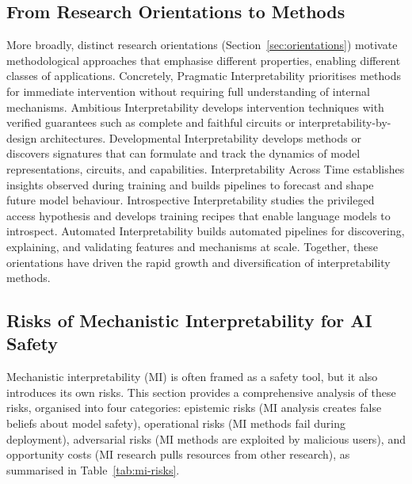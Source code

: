 \subsection{From Research Orientations to Methods}
More broadly, distinct research orientations (Section~\ref{sec:orientations}) motivate methodological approaches that emphasise different properties, enabling different classes of applications. Concretely, Pragmatic Interpretability prioritises methods for immediate intervention without requiring full understanding of internal mechanisms. Ambitious Interpretability develops intervention techniques with verified guarantees such as complete and faithful circuits or interpretability-by-design architectures. Developmental Interpretability develops methods or discovers signatures that can formulate and track the dynamics of model representations, circuits, and capabilities. Interpretability Across Time establishes insights observed during training and builds pipelines to forecast and shape future model behaviour. Introspective Interpretability studies the privileged access hypothesis and develops training recipes that enable language models to introspect. Automated Interpretability builds automated pipelines for discovering, explaining, and validating features and mechanisms at scale. Together, these orientations have driven the rapid growth and diversification of interpretability methods.

\subsection{Risks of Mechanistic Interpretability for AI Safety}
\label{sec:mi-risks}

Mechanistic interpretability (MI) is often framed as a safety tool, but it also introduces its own risks. This section provides a comprehensive analysis of these risks, organised into four categories: epistemic risks (MI analysis creates false beliefs about model safety), operational risks (MI methods fail during deployment), adversarial risks (MI methods are exploited by malicious users), and opportunity costs (MI research pulls resources from other research), as summarised in Table~\ref{tab:mi-risks}.

